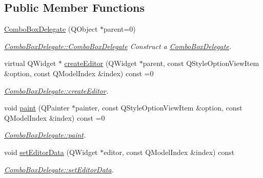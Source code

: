 \subsection*{Public Member Functions}
\begin{DoxyCompactItemize}
\item 
\hyperlink{classGui_1_1Widgets_1_1Delegates_1_1ComboBoxDelegate_a34105ef48d776c556598b9b15e7abdcc}{Combo\-Box\-Delegate} (Q\-Object $\ast$parent=0)
\begin{DoxyCompactList}\small\item\em \hyperlink{classGui_1_1Widgets_1_1Delegates_1_1ComboBoxDelegate_a34105ef48d776c556598b9b15e7abdcc}{Combo\-Box\-Delegate\-::\-Combo\-Box\-Delegate} Construct a \hyperlink{classGui_1_1Widgets_1_1Delegates_1_1ComboBoxDelegate}{Combo\-Box\-Delegate}. \end{DoxyCompactList}\item 
virtual Q\-Widget $\ast$ \hyperlink{classGui_1_1Widgets_1_1Delegates_1_1ComboBoxDelegate_aa24c5896e30295ad7dbe47c91093b2db}{create\-Editor} (Q\-Widget $\ast$parent, const Q\-Style\-Option\-View\-Item \&option, const Q\-Model\-Index \&index) const =0
\begin{DoxyCompactList}\small\item\em \hyperlink{classGui_1_1Widgets_1_1Delegates_1_1ComboBoxDelegate_aa24c5896e30295ad7dbe47c91093b2db}{Combo\-Box\-Delegate\-::create\-Editor}. \end{DoxyCompactList}\item 
void \hyperlink{classGui_1_1Widgets_1_1Delegates_1_1ComboBoxDelegate_a0b7f0752890cd3fb257361a7990a74c2}{paint} (Q\-Painter $\ast$painter, const Q\-Style\-Option\-View\-Item \&option, const Q\-Model\-Index \&index) const =0
\begin{DoxyCompactList}\small\item\em \hyperlink{classGui_1_1Widgets_1_1Delegates_1_1ComboBoxDelegate_a0b7f0752890cd3fb257361a7990a74c2}{Combo\-Box\-Delegate\-::paint}. \end{DoxyCompactList}\item 
void \hyperlink{classGui_1_1Widgets_1_1Delegates_1_1ComboBoxDelegate_a30d218e265b7656e17fece8a73e53e90}{set\-Editor\-Data} (Q\-Widget $\ast$editor, const Q\-Model\-Index \&index) const 
\begin{DoxyCompactList}\small\item\em \hyperlink{classGui_1_1Widgets_1_1Delegates_1_1ComboBoxDelegate_a30d218e265b7656e17fece8a73e53e90}{Combo\-Box\-Delegate\-::set\-Editor\-Data}. \end{DoxyCompactList}\item 

\end{DoxyCompactItemize}
